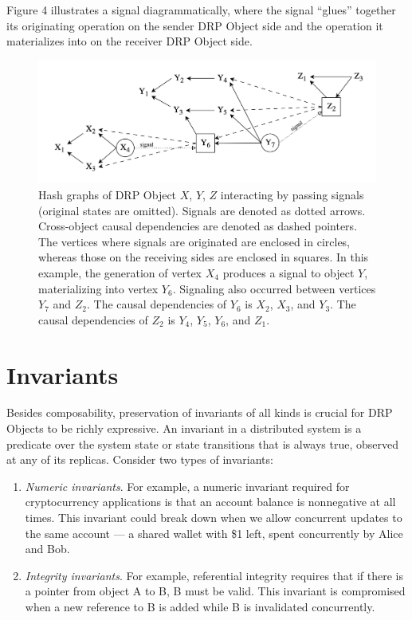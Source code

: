 \documentclass{article}
\begin{document}
Figure 4 illustrates a signal diagrammatically, where the signal “glues” together its originating operation on the sender DRP Object side and the operation it materializes into on the receiver DRP Object side.

\begin{figure}[htp]
    \centering
    \includegraphics[width=15cm]{fig4}
    \caption{Hash graphs of DRP Object $X$, $Y$, $Z$ interacting by passing signals (original states are omitted). Signals are denoted as dotted arrows. Cross-object causal dependencies are denoted as dashed pointers. The vertices where signals are originated are enclosed in circles, whereas those on the receiving sides are enclosed in squares. In this example, the generation of vertex $X_4$ produces a signal to object $Y$, materializing into vertex $Y_6$. Signaling also occurred between vertices $Y_7$ and $Z_2$. The causal dependencies of $Y_6$ is $X_2$, $X_3$, and $Y_3$. The causal dependencies of $Z_2$ is $Y_4$, $Y_5$, $Y_6$, and $Z_1$.}
    \label{fig:4}
\end{figure}

\section{Invariants}
\label{sec:headings}

Besides composability, preservation of invariants of all kinds is crucial for DRP Objects to be richly expressive. An invariant in a distributed system is a predicate over the system state or state transitions that is always true, observed at any of its replicas. Consider two types of invariants:
\begin{enumerate}
    \item \textit{Numeric invariants}. For example, a numeric invariant required for cryptocurrency applications is that an account balance is nonnegative at all times. This invariant could break down when we allow concurrent updates to the same account — a shared wallet with \$1 left, spent concurrently by Alice and Bob.
    \item \textit{Integrity invariants}. For example, referential integrity requires that if there is a pointer from object A to B, B must be valid. This invariant is compromised when a new reference to B is added while B is invalidated concurrently.
\end{enumerate}
\end{document}
